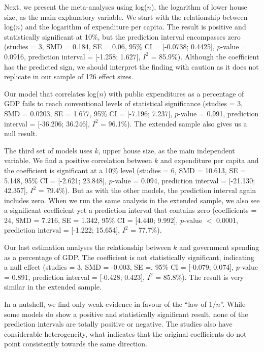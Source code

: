\documentclass[a4paper,12pt]{article}
\begin{document}
Next, we present the meta-analyses using log($n$), the logarithm of lower house
size, as the main explanatory variable. We start with the relationship between
log($n$) and the logarithm of expenditure per capita. The result is positive and
statistically significant at 10\%, but the prediction interval encompasses zero
(studies = 3, SMD = 0.184, SE = 0.06, 95\% CI = [-0.0738; 0.4425], $p$-value =
0.0916, prediction interval = [-1.258; 1.627], $I^2$ = 85.9\%). Although the
coefficient has the predicted sign, we should interpret the finding with caution
as it does not replicate in our sample of 126 effect sizes.

Our model that correlates log($n$) with public expenditures as a percentage of
GDP fails to reach conventional levels of statistical significance (studies =
3, SMD = 0.0203, SE = 1.677, 95\% CI = [-7.196; 7.237], $p$-value = 0.991,
prediction interval = [-36.206; 36.246], $I^2$ = 96.1\%). The extended sample
also gives us a null result.

The third set of models uses $k$, upper house size, as the main independent
variable. We find a positive correlation between $k$ and expenditure per capita
and the coefficient is significant at a 10\% level (studies = 6, SMD = 10.613, SE
= 5.148, 95\% CI = [-2.621; 23.848], $p$-value = 0.094, prediction interval =
[-21.130; 42.357], $I^2$ = 79.4\%). But as with the other models, the prediction
interval again includes zero. When we run the same analysis in the extended
sample, we also see a significant coefficient yet a prediction interval that
contains zero (coefficients = 24, SMD = 7.216, SE = 1.342, 95\% CI = [4.440; 9.992],
$p$-value $<$ 0.0001, prediction interval = [-1.222; 15.654], $I^2$ = 77.7\%).

Our last estimation analyses the relationship between $k$ and government
spending as a percentage of GDP. The coefficient is not statistically
significant, indicating a null effect (studies = 3, SMD = -0.003, SE =, 95\% CI
= [-0.079; 0.074], $p$-value = 0.891, prediction interval = [-0.428; 0.423],
$I^2$ = 85.8\%). The result is very similar in the extended sample.

In a nutshell, we find only weak evidence in favour of the ``law of $1/n$''.
While some models do show a positive and statistically significant result, none
of the prediction intervals are totally positive or negative. The studies also
have considerable heterogeneity, what indicates that the original coefficients
do not point consistently towards the same direction.
\end{document}
